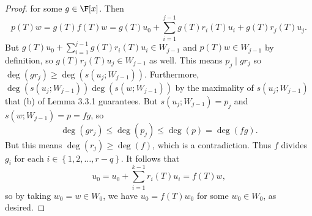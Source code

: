 \documentclass[linearalgebraII]{subfiles}
\begin{document}
\begin{proof}
        for some $g\in\F[x]$. Then
        \begin{equation*}
            p(T)w = g(T)f(T)w = g(T)u_0 + \sum^{j-1}_{i=1} g(T)r_i(T)u_i + g(T)r_j(T)u_j.
        \end{equation*}
        But $g(T)u_0+\sum^{j-1}_{i=1} g(T)r_i(T)u_i\in W_{j-1}$ and $p(T)w\in W_{j-1}$ by definition, so $g(T)r_j(T)u_j\in W_{j-1}$ as well. This means $p_j\mid gr_j$ so $\deg\left( gr_j \right) \geq \deg\left( s\left( u_j;W_{j-1} \right) \right)$. Furthermore, $\deg\left( s\left( u_j;W_{j-1} \right)  \right) \deg\left( s\left( w;W_{j-1} \right)  \right)$ by the maximality of $s\left( u_j;W_{j-1} \right) $ that (b) of Lemma 3.3.1 guarantees. But $s\left( u_j;W_{j-1} \right) = p_j$ and $s\left( w;W_{j-1} \right) = p = fg$, so
        \begin{equation*}
            \deg\left( gr_j \right) \leq \deg\left( p_j \right) \leq \deg(p) = \deg(fg).
        \end{equation*}
        But this means $\deg\left( r_j \right) \geq \deg(f)$, which is a contradiction. Thus $f$ divides $g_i$ for each $i\in\left\lbrace 1,2,\ldots,r-q \right\rbrace $. It follows that
        \begin{equation*}
            u_0 = u_0 + \sum^{k-1}_{i=1} r_i(T)u_i = f(T)w,
        \end{equation*}
        so by taking $w_0=w\in W_0$, we have $u_0 = f(T)w_0$ for some $w_0\in W_0$, as desired.
    \end{proof}

\end{document}
